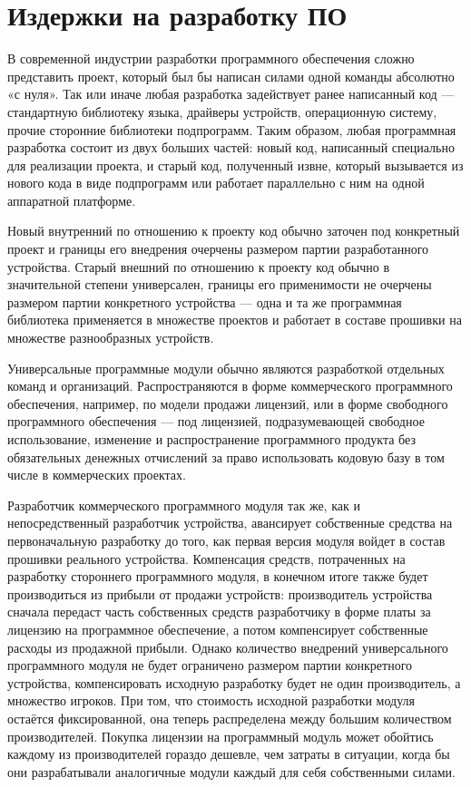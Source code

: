 \documentclass{article}
\begin{document}
\section*{Издержки на разработку ПО}

В современной индустрии разработки программного обеспечения сложно представить проект, который был бы написан силами одной команды абсолютно «с нуля». Так или иначе любая разработка задействует ранее написанный код — стандартную библиотеку языка, драйверы устройств, операционную систему, прочие сторонние библиотеки подпрограмм. Таким образом, любая программная разработка состоит из двух больших частей: новый код, написанный специально для реализации проекта, и старый код, полученный извне, который вызывается из нового кода в виде подпрограмм или работает параллельно с ним на одной аппаратной платформе.

Новый внутренний по отношению к проекту код обычно заточен под конкретный проект и границы его внедрения очерчены размером партии разработанного устройства. Старый внешний по отношению к проекту код обычно в значительной степени универсален, границы его применимости не очерчены размером партии конкретного устройства — одна и та же программная библиотека применяется в множестве проектов и работает в составе прошивки на множестве разнообразных устройств.

Универсальные программные модули обычно являются разработкой отдельных команд и организаций. Распространяются в форме коммерческого программного обеспечения, например, по модели продажи лицензий, или в форме свободного программного обеспечения — под лицензией, подразумевающей свободное использование, изменение и распространение программного продукта без обязательных денежных отчислений за право использовать кодовую базу в том числе в коммерческих проектах.

Разработчик коммерческого программного модуля так же, как и непосредственный разработчик устройства, авансирует собственные средства на первоначальную разработку до того, как первая версия модуля войдет в состав прошивки реального устройства. Компенсация средств, потраченных на разработку стороннего программного модуля, в конечном итоге также будет производиться из прибыли от продажи устройств: производитель устройства сначала передаст часть собственных средств разработчику в форме платы за лицензию на программное обеспечение, а потом компенсирует собственные расходы из продажной прибыли. Однако количество внедрений универсального программного модуля не будет ограничено размером партии конкретного устройства, компенсировать исходную разработку будет не один производитель, а множество игроков. При том, что стоимость исходной разработки модуля остаётся фиксированной, она теперь распределена между большим количеством производителей. Покупка лицензии на программный модуль может обойтись каждому из производителей гораздо дешевле, чем затраты в ситуации, когда бы они разрабатывали аналогичные модули каждый для себя собственными силами.
\end{document}
